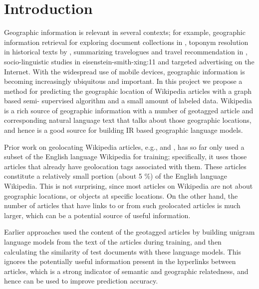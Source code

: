 \section{Introduction}

Geographic information is relevant in several contexts; for example,
geographic information retrieval for exploring document collections in
, toponym resolution in historical texts by
, summarizing travelogues and travel
recommendation in , socio-linguistic studies in \newcite
{eisenstein-smith-xing:11}  and targeted advertising on the Internet.  With
the widespread use of mobile devices, geographic information is becoming
increasingly ubiquitous and important.  In this project we propose a method
for predicting the geographic location of Wikipedia articles with a graph
based semi- supervised algorithm and a small amount of labeled data. Wikipedia
is a rich source of geographic information with a number of geotagged article
and corresponding natural language text that talks about those geographic
locations, and hence is a good source for building IR based geographic
language models.

\par Prior work on geolocating Wikipedia articles, e.g., 
 and  , has so far only used a subset of
the English language Wikipedia for training; specifically, it uses those
articles that already have geolocation tags associated with them.  These
articles constitute a relatively small portion (about 5 \%) of the English language
Wikipedia. This is not surprising, since most
articles on Wikipedia are not about geographic locations, or objects at
specific locations. On the other hand, the number of articles that have links
to or from such geolocated articles is much larger, which can be a potential
source of useful information. 

\par Earlier approaches used the content of the geotagged articles by building
unigram language models from the text of the articles during training, and
then calculating the similarity of test documents with these language models.
This ignores the potentially useful information present in the hyperlinks
between articles, which is a strong indicator of semantic and geographic
relatedness, and hence can be used to improve prediction accuracy.

